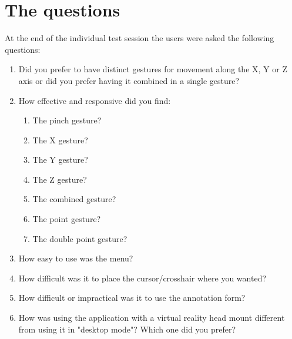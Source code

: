 \section{The questions}
At the end of the individual test session the users were asked the following questions:

\begin{enumerate}
      \item Did you prefer to have distinct gestures for movement along the X, Y or Z axis or did you prefer having it combined in a single gesture?
      \item How effective and responsive did you find:
      \begin{enumerate}
            \item The pinch gesture?
            \item The X gesture?
            \item The Y gesture?
            \item The Z gesture?
            \item The combined gesture?
            \item The point gesture?
            \item The double point gesture?
      \end{enumerate}
      \item How easy to use was the menu?
      \item How difficult was it to place the cursor/crosshair where you wanted?
      \item How difficult or impractical was it to use the annotation form?
      \item How was using the application with a virtual reality head mount different from using it in "desktop mode"? 
            Which one did you prefer?
\end{enumerate}


